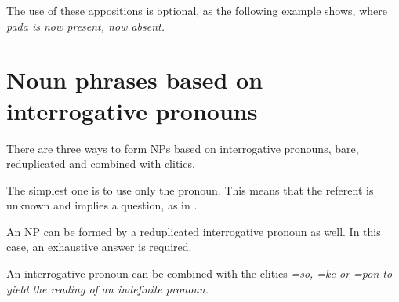 The use of these appositions is optional, as the following example shows, where \em pada \em is now present, now absent.



\section{Noun phrases based on interrogative pronouns}\label{sec:nppp:Nounphrasesbasedoninterrogativepronouns}
There are three ways to form NPs based on interrogative pronouns, bare, reduplicated and combined with clitics.

The simplest one is to use only the pronoun. This means that the referent is unknown and implies a question, as in .




An NP can be formed by a reduplicated interrogative pronoun as well. In this case, an exhaustive answer is required.


An interrogative pronoun can be combined with the clitics \em =so, =ke \em or \em =pon \em to yield the reading of an indefinite pronoun.


